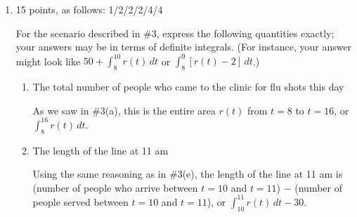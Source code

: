 \documentclass{article}
\begin{document}
\begin{enumerate}
{\begin{enumerate}
    \item
      \begin{problem}[\vfill\newpage]
        Approximately how long is the line at 3 pm?
      \end{problem}

      \begin{solution} %
        We already figured out that the line has about 45 people in it at
        2 pm, so let's figure out what happens between 2 and 3 pm.  In
        this time, 30 people are served, but roughly 23 people arrive
        (this is the area under $r(t)$ from $t = 14$ to $t = 15$, which is
        about 1.5 grid squares).  So, at 3 pm, the line has about $45 - 30
        + 23 = \boxed{38 \text{ people}}$.
      \end{solution}

    \end{enumerate}
  }

\item 

\begin{grading}
15 points, as follows: 1/2/2/2/4/4
\end{grading}

For the scenario described in {{\#3}}, express the
  following quantities exactly; your answers may be in terms of definite
  integrals.  (For instance, your answer might look like $50 +
  \displaystyle \int_8^{10} r(t)\,dt$ or $\displaystyle \int_8^9 [r(t) -
  2]\,dt$.)

  \begin{enumerate}
    \item
    \begin{problem}[\vfill]
      The total number of people who came to the clinic for flu shots this day 
    \end{problem}

    \begin{solution}
      As we saw in {{{{\#3}}(a)}}, this is the entire area $r(t)$
      from $t = 8$ to $t = 16$, or $\boxed{\int_8^{16} r(t) \, dt}$.
    \end{solution}
    
  \item
\begin{problem}[\vfill]
      The length of the line at 11 am
    \end{problem}

    \begin{solution} 
      Using the same reasoning as in {{{{\#3}}(e)}}, the length of
      the line at 11 am is (number of people who arrive between $t = 10$
      and $t = 11$) $-$ (number of people served between $t = 10$ and $t =
      11$), or $\boxed{\int_{10}^{11} r(t)\,dt - 30}$.
    \end{solution}


\end{enumerate}
\end{enumerate}
\end{document}
